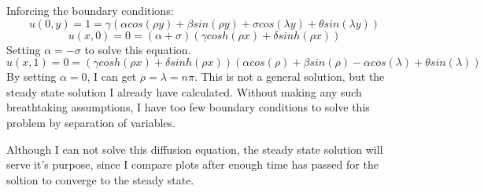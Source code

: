 \documentclass[a4paper, 12pt, titlepage]{article}
\newcommand{\beq}{\begin{equation*}}
\newcommand{\eeq}{\end{equation*}}
\begin{document}
\begin{section}
\begin{subsection}
   Inforcing the boundary conditions:
   \beq u(0,y) = 1 = \gamma (\alpha cos(\rho y) + \beta sin(\rho y) + \sigma cos(\lambda y) + \theta sin(\lambda y)) \eeq
   \beq u(x,0) = 0 = (\alpha + \sigma) (\gamma cosh(\rho x) + \delta sinh(\rho x)) \eeq
   Setting $\alpha = -\sigma$ to solve this equation. 
   \beq u(x,1) = 0 = (\gamma cosh(\rho x) + \delta sinh(\rho x)) (\alpha cos(\rho)+\beta sin(\rho )-\alpha cos(\lambda)+\theta sin(\lambda )) \eeq
   By setting $\alpha = 0$, I can get $\rho = \lambda = n\pi$. This is not a general solution, but the 
   steady state solution I already have calculated. Without making any such breathtaking assumptions, I have
   too few boundary conditions to solve this problem by separation of variables. 
   
   Although I can not solve this diffusion equation, the steady state solution will serve it's purpose, since
   I compare plots after enough time has passed for the soltion to converge to the steady state. 
  
  \end{subsection}
  
  \end{section}
\end{document}
